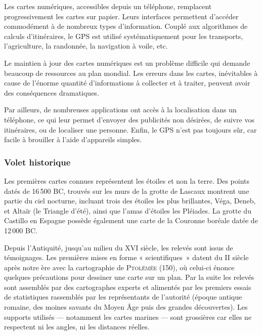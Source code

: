 \begin{tcolorbox}[title={Impacts sur les pratiques humaines}, toprule=0pt, leftrule=0pt, rightrule=0pt, arc=0pt,
                  fonttitle=\scshape\boxtitlefont,
                  colbacktitle=white, coltitle=firstcolor, colframe=firstcolor, colback=firstcolor!10,
                  breakable, enhanced jigsaw]
Les cartes numériques, accessibles depuis un téléphone, remplacent progressivement les cartes sur papier. Leurs interfaces permettent d’accéder commodément à de nombreux types d’information. Couplé aux algorithmes de calculs d’itinéraires, le GPS est utilisé systématiquement pour les transports, l’agriculture, la randonnée, la navigation à voile, etc.

Le maintien à jour des cartes numériques est un problème difficile qui demande beaucoup de ressources au plan mondial. Les erreurs dans les cartes, inévitables à cause de l’énorme quantité d’informations à collecter et à traiter, peuvent avoir des conséquences dramatiques.

Par ailleurs, de nombreuses applications ont accès à la localisation dans un téléphone, ce qui leur permet d’envoyer des publicités non désirées, de suivre vos itinéraires, ou de localiser une personne. Enfin, le GPS n’est pas toujours sûr, car facile à brouiller à l’aide d’appareils simples.
\end{tcolorbox}

\subsubsection[Volet historique]{Volet historique}
\label{subsub:VIII.4.1.2}

%
Les premières cartes connues représentent les étoiles et non la terre. Des points datés de 16\,500 BC, trouvés sur les murs de la grotte de Lascaux montrent une partie du ciel nocturne, incluant trois des étoiles les plus brillantes, Véga, Deneb, et Altaïr (le Triangle d'été), ainsi que l'amas d'étoiles les Pléiades. La grotte du Castillo en Espagne possède également une carte de la Couronne boréale datée de 12\,000 BC. 

Depuis l'Antiquité, jusqu'au milieu du XVI siècle, les relevés sont issus de témoignages. Les premières mises en forme « scientifiques~» datent du II siècle après notre ère avec la cartographie de \textsc{Ptolémée} (150), où celui-ci énonce quelques précautions pour dessiner une carte sur un plan. Par la suite les relevés sont assemblés par des cartogra\-phes experts et alimentés par les premiers essais de statistiques rassemblés par les représentants de l'autorité (époque antique romaine, des moines savants du Moyen Âge puis des grandes découvertes). Les supports utilisés --- notamment les cartes marines --- sont grossières car elles ne respectent ni les angles, ni les distances réelles. 

